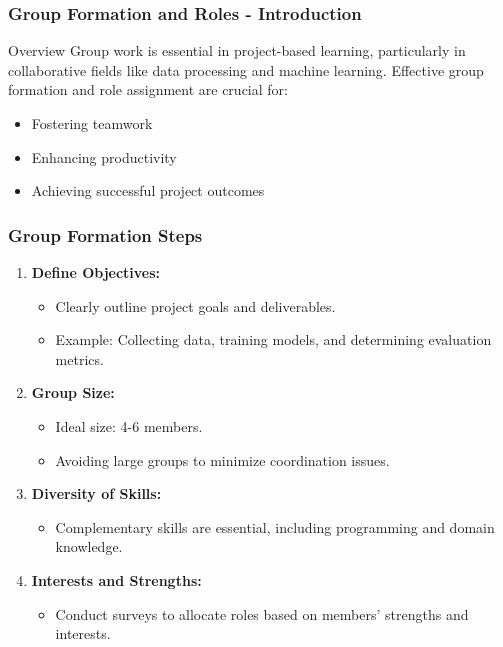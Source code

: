 \documentclass[aspectratio=169]{beamer}
\begin{document}
\begin{frame}[fragile]
    \frametitle{Group Formation and Roles - Introduction}
    \begin{block}{Overview}
        Group work is essential in project-based learning, particularly in collaborative fields like data processing and machine learning. 
        Effective group formation and role assignment are crucial for:
        \begin{itemize}
            \item Fostering teamwork
            \item Enhancing productivity
            \item Achieving successful project outcomes
        \end{itemize}
    \end{block}
\end{frame}

\begin{frame}[fragile]
    \frametitle{Group Formation Steps}
    \begin{enumerate}
        \item \textbf{Define Objectives:}
            \begin{itemize}
                \item Clearly outline project goals and deliverables.
                \item Example: Collecting data, training models, and determining evaluation metrics.
            \end{itemize}
        \item \textbf{Group Size:}
            \begin{itemize}
                \item Ideal size: 4-6 members.
                \item Avoiding large groups to minimize coordination issues.
            \end{itemize}
        \item \textbf{Diversity of Skills:}
            \begin{itemize}
                \item Complementary skills are essential, including programming and domain knowledge.
            \end{itemize}
        \item \textbf{Interests and Strengths:}
            \begin{itemize}
                \item Conduct surveys to allocate roles based on members' strengths and interests.
            \end{itemize}
    \end{enumerate}
\end{frame}
\end{document}
